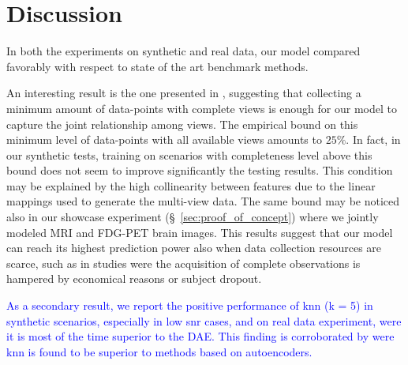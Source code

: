 \section{Discussion}

In both the experiments on synthetic and real data, our model compared favorably with respect to state of the art benchmark methods.

An interesting result is the one presented in , suggesting that collecting a minimum amount of data-points with complete views is enough for our model to capture the joint relationship among views.
The empirical bound on this minimum level of data-points with all available views amounts to $25\%$.
In fact, in our synthetic tests, training on scenarios with completeness level above this bound does not seem to improve significantly the testing results.
This condition may be explained by the high collinearity between features due to the linear mappings used to generate the multi-view data.
The same bound may be noticed also in our showcase experiment (\S~\ref{sec:proof_of_concept}) where we jointly modeled MRI and FDG-PET brain images.
This results suggest that our model can reach its highest prediction power also when data collection resources are scarce,
such as in studies were the acquisition of complete observations is hampered by economical reasons or subject dropout.

\textcolor{blue}{
	As a secondary result, we report the positive performance of knn (k = 5) in synthetic scenarios, especially in low snr cases, and on real data experiment, were it is most of the time superior to the DAE.
	This finding is corroborated by \cite{Platias2020} were knn is found to be superior to methods based on autoencoders.
}

